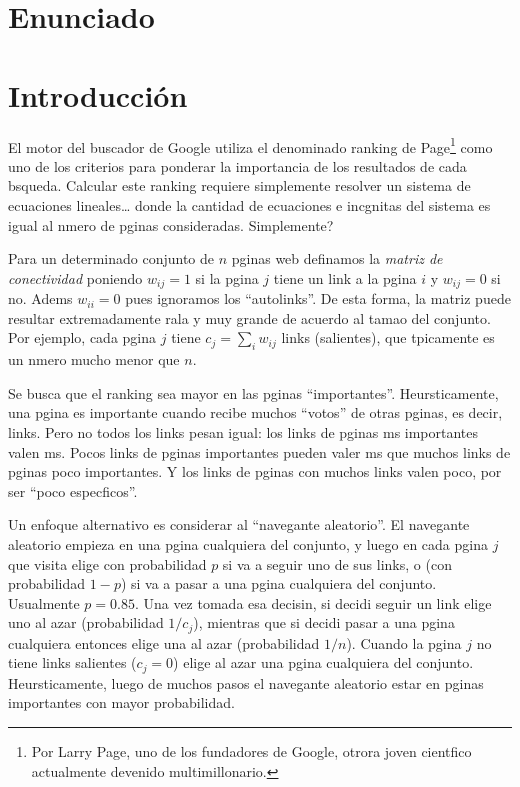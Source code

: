 \section{Enunciado}

\section*{Introducción}

El motor del buscador de Google utiliza el denominado ranking de Page\footnote{Por Larry Page, uno de los fundadores de Google, otrora joven cientfico actualmente devenido multimillonario.} como uno de los criterios para ponderar la importancia de los resultados de cada bsqueda. Calcular este ranking requiere simplemente resolver un sistema de ecuaciones lineales\ldots{} donde la cantidad de ecuaciones e incgnitas del sistema es igual al nmero de pginas consideradas. Simplemente?

Para un determinado conjunto de $n$ pginas web definamos la \emph{matriz de conectividad} \mW{} poniendo $w_{ij} = 1$ si la pgina $j$ tiene un link a la pgina $i$ y $w_{ij} = 0$ si no. Adems $w_{ii} = 0$ pues ignoramos los ``autolinks''. De esta forma, la matriz \mW{} puede resultar extremadamente rala y muy grande de acuerdo al tamao del conjunto. Por ejemplo, cada pgina $j$ tiene $c_j = \sum_i w_{ij}$ links (salientes), que tpicamente es un nmero mucho menor que $n$.

Se busca que el ranking sea mayor en las pginas ``importantes''. Heursticamente, una pgina es importante cuando recibe muchos ``votos'' de otras pginas, es decir, links. Pero no todos los links pesan igual: los links de pginas ms importantes valen ms. Pocos links de pginas importantes pueden valer ms que muchos links de pginas poco importantes. Y los links de pginas con muchos links valen poco, por ser ``poco especficos''. 

Un enfoque alternativo es considerar al ``navegante aleatorio''. El navegante aleatorio empieza en una pgina cualquiera del conjunto, y luego en cada pgina $j$ que visita elige con probabilidad $p$ si va a seguir uno de sus links, o (con probabilidad $1-p$) si va a pasar a una pgina cualquiera del conjunto. Usualmente $p=0.85$. Una vez tomada esa decisin, si decidi seguir un link elige uno al azar (probabilidad $1/c_j$), mientras que si decidi pasar a una pgina cualquiera entonces elige una al azar (probabilidad $1/n$). Cuando la pgina $j$ no tiene links salientes ($c_j = 0$) elige al azar una pgina cualquiera del conjunto. Heursticamente, luego de muchos pasos el navegante aleatorio estar en pginas importantes con mayor probabilidad.

